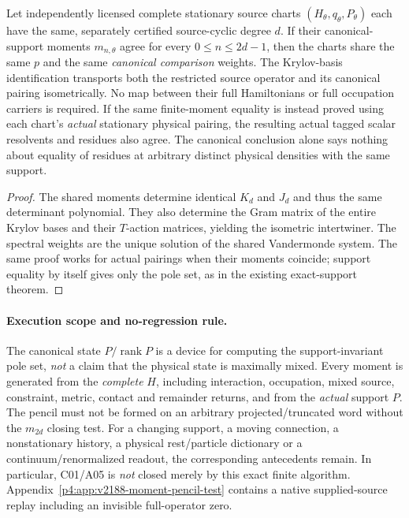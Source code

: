 \documentclass[12pt,a4paper]{article}
\begin{document}
\begin{corollary}
\label{p4:cor:v2188-common-moments}
Let independently licensed complete stationary source charts
$(H_\theta,q_\theta,P_\theta)$ each have the same, separately certified
source-cyclic degree $d$. If their canonical-support moments
$m_{n,\theta}$ agree for every $0\le n\le2d-1$, then the charts share
the same $p$ and the same \emph{canonical comparison} weights. The
Krylov-basis identification transports both the restricted source
operator and its canonical pairing isometrically. No map between their
full Hamiltonians or full occupation carriers is required.
If the same finite-moment equality is instead proved using each chart's
\emph{actual} stationary physical pairing, the resulting actual tagged
scalar resolvents and residues also agree. The canonical conclusion
alone says nothing about equality of residues at arbitrary distinct
physical densities with the same support.
\end{corollary}
\begin{proof}
The shared moments determine identical $K_d$ and $J_d$ and thus the
same determinant polynomial. They also determine the Gram matrix of
the entire Krylov bases and their $T$-action matrices, yielding the
isometric intertwiner. The spectral weights are the unique solution of
the shared Vandermonde system. The same proof works for actual pairings
when their moments coincide; support equality by itself gives only the
pole set, as in the existing exact-support theorem.
\end{proof}

\paragraph{Execution scope and no-regression rule.}
The canonical state $P/\operatorname{rank}P$ is a device for computing the
support-invariant pole set, \emph{not} a claim that the physical state is
maximally mixed. Every moment is generated from the \emph{complete}
$H$, including interaction, occupation, mixed source, constraint, metric,
contact and remainder returns, and from the \emph{actual} support $P$.
The pencil must not be formed on an arbitrary projected/truncated word
without the $m_{2d}$ closing test. For a changing support, a moving
connection, a nonstationary history, a physical rest/particle dictionary
or a continuum/renormalized readout, the corresponding antecedents remain.
In particular, C01/A05 is \emph{not} closed merely by this exact finite
algorithm. Appendix~\ref{p4:app:v2188-moment-pencil-test} contains a
native supplied-source replay including an invisible full-operator zero.
\end{document}

